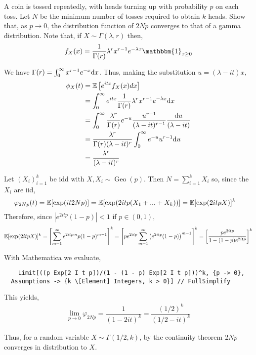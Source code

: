 \documentclass[10pt]{article}
\begin{document}
\begin{problem}[Exercise 3.7]
A coin is tossed repeatedly, with heads turning up with probability \( p \) on each toss. Let \( N \) be the minimum number of tosses required to obtain \( k \) heads. Show that, as \( p\to 0 \), the distribution function of \( 2Np \) converges to that of a gamma distribution. Note that, if \(X \sim\Gamma(\lambda,r) \) then,
    \begin{align*}
        f_X(x) = \dfrac{1}{\Gamma(r)}\lambda^rx^{r-1}e^{-\lambda x}\mathbbm{1}_{x\geq 0}
    \end{align*}
\end{problem}

\begin{solution}[Solution]
We have \( \Gamma(r) = \int_{0}^{\infty} x^{r-1}e^{-x}\mathrm{d} x \). Thus, making the substitution \( u=(\lambda-it)x \),
\begin{align*}
    \phi_X(t) &= \mathbb{E}\left[ e^{itx}f_X(x)dx \right] \\ 
    &= \int_{0}^{\infty} e^{itx} \dfrac{1}{\Gamma(r)}\lambda^r x^{r-1}e^{-\lambda x} \mathrm{d} x \\
    &= \int_{0}^{\infty} \dfrac{\lambda^r}{\Gamma(r)}e^{-u} \dfrac{u^{r-1}}{(\lambda-it)^{r-1}} \dfrac{\mathrm{d} u}{(\lambda-it)} \\
    &= \dfrac{\lambda^r}{\Gamma(r)(\lambda-it)^r}\int_{0}^{\infty} e^{-u}u^{r-1} \mathrm{d} u \\
    &= \dfrac{\lambda^r}{(\lambda-it)^r}
\end{align*}


Let \( (X_i)_{i=1}^{k} \) be idd  with \( X,X_i\sim \operatorname{Geo}(p) \).
Then \( N=\sum_{i=1}^{k} X_i \) so, since the \( X_i \) are iid,
\begin{align*}
    \varphi_{2Np}(t) &= \mathbb{E}[\exp(it2Np)] 
    =\mathbb{E}[\exp(2itp(X_1+...+X_k))] 
    =\mathbb{E}[\exp(2itpX)]^k 
\end{align*}
Therefore, since \( |e^{2itp}(1-p)|<1 \) if \( p\in(0,1) \),
\begin{align*}
    \mathbb{E}[\exp(2itpX)]^k 
    = \left[ \sum_{m=1}^{\infty} e^{2itpm}p(1-p)^{m-1} \right]^k 
    = \left[ pe^{2itp}\sum_{m=1}^{\infty}\left(e^{2itp}(1-p)\right)^{m-1} \right]^k 
    = \left[ \dfrac{pe^{2itp}}{1-(1-p)e^{2itp}} \right]^k
\end{align*}

With Mathematica we evaluate,
\begin{lstlisting}
    Limit[((p Exp[2 I t p])/(1 - (1 - p) Exp[2 I t p]))^k, {p -> 0}, 
  Assumptions -> {k \[Element] Integers, k > 0}] // FullSimplify
\end{lstlisting}

This yields,
\begin{align*}
    \lim_{p\to 0} \varphi_{2Np} = \dfrac{1}{(1-2it)^k} = \dfrac{(1/2)^k}{(1/2-it)^k}
\end{align*}

Thus, for a random variable \( X\sim\Gamma(1/2,k) \), by the continuity theorem \( 2Np \) converges in distribution to \( X \).

\end{solution}
\end{document}
